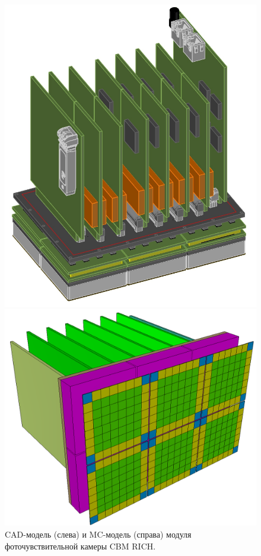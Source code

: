 \begin{figure}[H]
\begin{minipage}[b]{0.495\textwidth}
\includegraphics[width=1.0\textwidth]{pictures/PMTmoduleCAD.png}
\end{minipage}
\hspace{0.01\textwidth}
\begin{minipage}[b]{0.495\textwidth}
\includegraphics[width=1.0\textwidth]{pictures/Module_1_cut.png}
\end{minipage}
\caption{CAD-модель (слева) и MC-модель (справа) модуля фоточувствительной камеры CBM RICH.}
\label{fig:geoMCmodule}
\end{figure}

